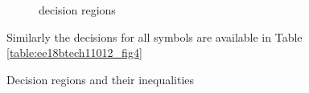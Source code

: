 \begin{enumerate}[label=\thesubsection.\arabic*.,ref=\thesubsection.\theenumi]
\begin{figure}[!ht]
\caption{decision regions}
\label{fig:ee18btech11012_fig2}
	
\end{figure}

%
%
%	



Similarly the decisions for all symbols 
are available in Table \ref{table:ee18btech11012_fig4}
%
\begin{table}[!ht]
                \resizebox{\columnwidth}{!}{}
\caption{Decision regions and their inequalities}
\label{table:ee18btech11012_fig4}
\end{table}



\end{enumerate}
